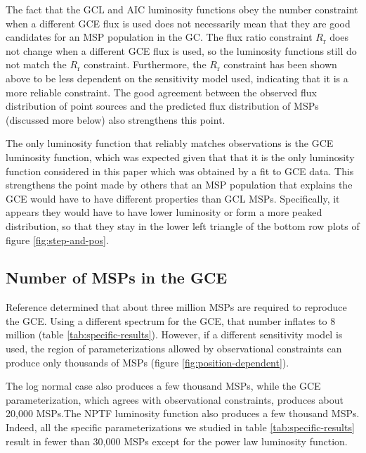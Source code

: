 \documentclass[a4paper,11pt]{article}
\newcommand{\comment}[1]{\emph{\color{red}{#1}}}
\begin{document}
The fact that the GCL and AIC luminosity functions obey the number constraint when a different GCE flux is used does not necessarily mean that they are good candidates for an MSP population in the GC. The flux ratio constraint $R_\text{r}$ does not change when a different GCE flux is used, so the luminosity functions still do not match the $R_\text{r}$ constraint. Furthermore, the $R_\text{r}$ constraint has been shown above to be less dependent on the sensitivity model used, indicating that it is a more reliable constraint. The good agreement between the observed flux distribution of point sources and the predicted flux distribution of MSPs (discussed more below) also strengthens this point.

The only luminosity function that reliably matches observations is the GCE luminosity function, which was expected given that that it is the only luminosity function considered in this paper which was obtained by a fit to GCE data. This strengthens the point made by others \cite{citation-needed} that an MSP population that explains the GCE would have to have different properties than GCL MSPs. Specifically, it appears they would have to have lower luminosity or form a more peaked distribution, so that they stay in the lower left triangle of the bottom row plots of figure \ref{fig:step-and-pos}.

\subsection{Number of MSPs in the GCE}
Reference \cite{Zhong:2019ycb} determined that about three million MSPs are required to reproduce the GCE. Using a different spectrum for the GCE, that number inflates to 8 million (table \ref{tab:specific-results}). However, if a different sensitivity model is used, the region of parameterizations allowed by observational constraints can produce only thousands of MSPs (figure \ref{fig:position-dependent}).

The log normal case also produces a few thousand MSPs, while the GCE parameterization, which agrees with observational constraints, produces about 20,000 MSPs.The NPTF luminosity function also produces a few thousand MSPs. Indeed, all the specific parameterizations we studied in table \ref{tab:specific-results} result in fewer than 30,000 MSPs except for the power law luminosity function. \comment{In consultation with Tracy, make some final judgment about how many pulsars are likely to be in the GCE.}
\end{document}
